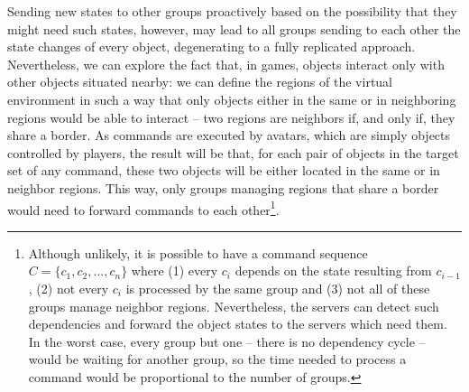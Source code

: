 \documentclass[]{usiinfprospectus}
\begin{document}
Sending new states to other groups proactively based on the possibility that they might need such states, however, may lead to all groups sending to each other the state changes of every object, degenerating to a fully replicated approach. Nevertheless, we can explore the fact that, in games, objects interact only with other objects situated nearby: we can define the regions of the virtual environment in such a way that only objects either in the same or in neighboring regions would be able to interact -- two regions are neighbors if, and only if, they share a border. As commands are executed by avatars, which are simply objects controlled by players, the result will be that, for each pair of objects in the target set of any command, these two objects will be either located in the same or in neighbor regions. This way, only groups managing regions that share a border would need to forward commands to each other\footnote{Although unlikely, it is possible to have a command sequence $C = \{c_1,c_2,\ldots,c_n\}$ where (1) every $c_i$ depends on the state resulting from $c_{i-1}$, (2) not every $c_i$ is processed by the same group and (3) not all of these groups manage neighbor regions. Nevertheless, the servers can detect such dependencies and forward the object states to the servers which need them. In the worst case, every group but one -- there is no dependency cycle -- would be waiting for another group, so the time needed to process a command would be proportional to the number of groups.}.

% 

\end{document}
